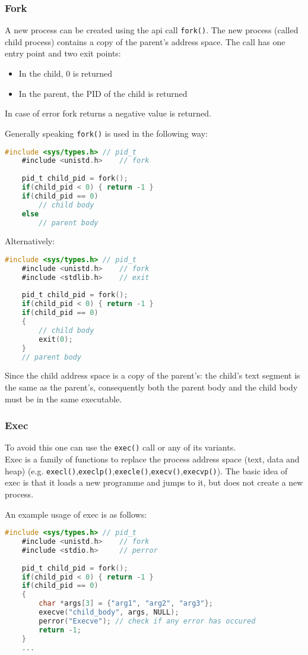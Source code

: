 \subsubsection{Fork}
A new process can be created using the api call \texttt{fork()}. The new process (called child process) contains a copy of the parent's address space. The call has one entry point and two exit points:
\begin{itemize}
    \item In the child, 0 is returned
    \item In the parent, the PID of the child is returned
\end{itemize}
In case of error fork returns a negative value is returned.

Generally speaking \texttt{fork()} is used in the following way:
\begin{lstlisting}[language=C]
    #include <sys/types.h> // pid_t
    #include <unistd.h>    // fork
    
    pid_t child_pid = fork();
    if(child_pid < 0) { return -1 }
    if(child_pid == 0)
        // child body
    else
        // parent body 
\end{lstlisting}
Alternatively:
\begin{lstlisting}[language=C]
    #include <sys/types.h> // pid_t
    #include <unistd.h>    // fork
    #include <stdlib.h>    // exit
    
    pid_t child_pid = fork();
    if(child_pid < 0) { return -1 }
    if(child_pid == 0)
    {
        // child body
        exit(0);
    }
    // parent body 
\end{lstlisting}

Since the child address space is a copy of the parent's: the child's text segment is the same as the parent's, consequently both the parent body and the child body must be in the same executable.

\subsubsection{Exec}
To avoid this one can use the \texttt{exec()} call or any of its variants.\\
Exec is a family of functions to replace the process address space (text, data and heap) (e.g. \texttt{execl()},\texttt{execlp()},\texttt{execle()},\texttt{execv()},\texttt{execvp()}).
The basic idea of exec is that it loads a new programme and jumps to it, but does not create a new process.

An example usage of exec is as follows:
\begin{lstlisting}[language=C]
    #include <sys/types.h> // pid_t
    #include <unistd.h>    // fork
    #include <stdio.h>     // perror
    
    pid_t child_pid = fork();
    if(child_pid < 0) { return -1 }
    if(child_pid == 0)
    {
        char *args[3] = {"arg1", "arg2", "arg3"};
        execve("child_body", args, NULL);
        perror("Execve"); // check if any error has occured
        return -1;
    }
    ...
\end{lstlisting}

